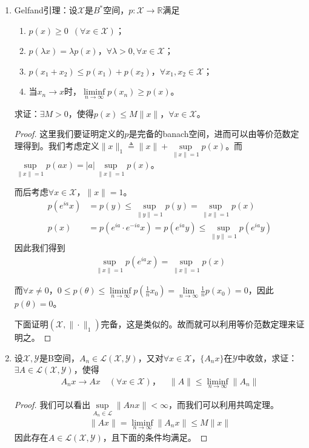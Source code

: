 \begin{enumerate}[leftmargin=2cm, label=\arabic*]
		\item Gelfand引理：设$\mathscr{X}$是$B^*$空间，$p:\mathscr{X}\to\mathbb{R}$满足
		\begin{enumerate}[leftmargin=1cm, label=(\arabic*)]
			\item $p(x)\geqslant 0$\ $(\forall x\in\mathscr{X})$；
			\item $p(\lambda x) = \lambda p(x)$，$\forall \lambda >0,\forall x\in\mathscr{X}$；
			\item $p(x_1+x_2) \leqslant p(x_1) + p(x_2)$，$\forall x_1,x_2\in\mathscr{X}$；
			\item 当$x_n\to x$时，$\liminf\limits_{n\to\infty} p(x_n) \geqslant p(x)$。
		\end{enumerate}
		求证：$\exists M>0$，使得$p(x)\leqslant M\|x\|$，$\forall x\in\mathscr{X}$。
		\begin{proof}
			这里我们要证明定义的$p$是完备的banach空间，进而可以由等价范数定理得到。我们考虑定义$\|x\|_1\triangleq\|x\| + \sup\limits_{\|x\| = 1} p(x)$。而$\sup\limits_{\|x\| = 1} p(ax) = |a| \sup\limits_{\|x\| = 1} p(x)$。
			
			而后考虑$\forall x\in \mathscr{X}$，$\|x\| =1$。
			\begin{align*}
				p(e^{ia}x) &= p(y) \leqslant \sup\limits_{\|y\| = 1} p(y) = \sup\limits_{\|x\| = 1} p(x) \\
				p(x) &= p(e^{ia} \cdot e^{-ia}x) = p(e^{ia}y) \leqslant \sup\limits_{\|y\| = 1} p(e^{ia}y)
			\end{align*}    
			因此我们得到
			\begin{align*}
				\sup\limits_{\|x\| = 1} p(e^{ia}x) = \sup\limits_{\|x\| = 1} p(x)
			\end{align*}
			
			而$\forall x\neq 0$，$0\leqslant p(\theta) \leqslant \liminf\limits_{n\to\infty} p(\frac{1}{n}x_0) = \lim\limits_{n\to\infty} \frac{1}{n}p(x_0) = 0 $，因此$p(\theta) = 0$。
			
			下面证明$(\mathscr{X},\|\cdot\|_1)$完备，这是类似的。故而就可以利用等价范数定理来证明之。
		\end{proof}
		
		\item 设$\mathscr{X},\mathscr{Y}$是B空间，$A_n\in\mathscr{L}(\mathscr{X},\mathscr{Y})$，又对$\forall x\in\mathscr{X}$，$\{A_nx\}$在$\mathscr{Y}$中收敛，求证：$\exists A\in\mathscr{L}(\mathscr{X},\mathscr{Y})$，使得  
		\begin{align*}
			A_n x\to Ax\quad (\forall x\in\mathscr{X})，\quad \|A\| \leqslant \liminf\limits_{n\to\infty} \|A_n\|
		\end{align*}
		\begin{proof}
			我们可以看出$\sup\limits_{A_n\in \mathscr{L}}\|Anx\|<\infty$，而我们可以利用共鸣定理。
			\begin{align*}
				\|Ax\| = \liminf\limits_{n\to\infty} \|A_nx\| \leqslant M\|x\| 
			\end{align*}
			因此存在$A\in\mathscr{L}(\mathscr{X},\mathscr{Y})$，且下面的条件均满足。
		\end{proof}
		

\end{enumerate}
